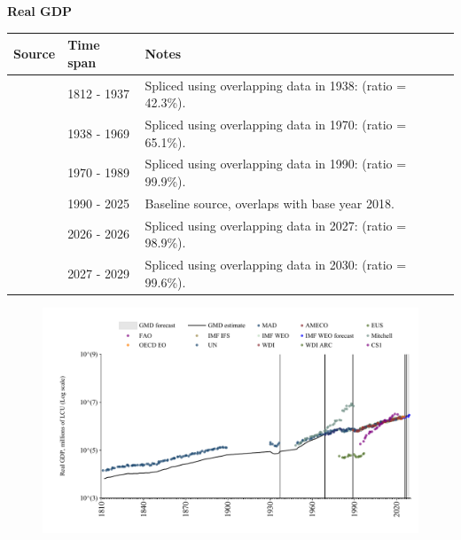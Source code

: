 \documentclass[12pt,a4paper,landscape]{article}
\begin{document}
\begin{adjustbox}{max totalsize={\paperwidth}{\paperheight},center}
\begin{minipage}[t][\textheight][t]{\textwidth}
\vspace*{0.5cm}
{}
\begin{center}
{\Large\bfseries Real GDP}
\end{center}
\vspace{0.5cm}
\begin{table}[H]
\centering
\small
\begin{tabular}{|l|l|l|}
\hline
\textbf{Source} & \textbf{Time span} & \textbf{Notes} \\
\hline
\rowcolor{white}\cite{MAD}& 1812 - 1937 &Spliced using overlapping data in 1938: (ratio = 42.3\%). \\
\rowcolor{lightgray}\cite{Mitchell}& 1938 - 1969 &Spliced using overlapping data in 1970: (ratio = 65.1\%). \\
\rowcolor{white}\cite{UN}& 1970 - 1989 &Spliced using overlapping data in 1990: (ratio = 99.9\%). \\
\rowcolor{lightgray}\cite{OECD_EO}& 1990 - 2025 &Baseline source, overlaps with base year 2018. \\
\rowcolor{white}\cite{AMECO}& 2026 - 2026 &Spliced using overlapping data in 2027: (ratio = 98.9\%). \\
\rowcolor{lightgray}\cite{IMF_WEO_forecast}& 2027 - 2029 &Spliced using overlapping data in 2030: (ratio = 99.6\%). \\
\hline
\end{tabular}
\end{table}
\begin{figure}[H]
\centering
\includegraphics[width=\textwidth,height=0.6\textheight,keepaspectratio]{graphs/POL_rGDP.pdf}
\end{figure}
\end{minipage}
\end{adjustbox}
\end{document}
